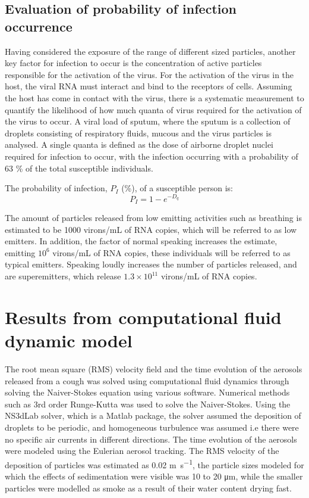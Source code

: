 \documentclass[11pt]{report}
\begin{document}
 
\subsection{Evaluation of probability of infection occurrence}

 
Having considered the exposure of the range of different sized particles, another key factor for infection to occur is the concentration of active particles responsible for the activation of the virus. For the activation of the virus in the host, the viral RNA must interact and bind to the receptors of cells. Assuming the host has come in contact with the virus, there is a systematic measurement to quantify the likelihood of how much quanta of virus required for the activation of the virus to occur. A viral load of sputum, where the sputum is a collection of droplets consisting of respiratory fluids, mucous and the virus particles is analysed. A single quanta is defined as the dose of airborne droplet nuclei required for infection to occur, with the infection occurring with a probability of 63 \% of the total susceptible individuals.
 
The probability of infection, $P_I$ (\%), of a susceptible person is:
\begin{equation}\label{dose_response}
P_I = 1-e^{-D_q}
\end{equation}


The amount of particles released from low emitting activities such as breathing is estimated to be 1000 virons/mL of RNA copies, which will be referred to as low emitters. In addition, the factor of normal speaking increases the estimate, emitting $10^{6}$ virons/mL of RNA copies, these individuals will be referred to as typical emitters. Speaking loudly increases the number of particles released, and are superemitters, which release  $1.3 × 10^{11}$ virons/mL of RNA copies.


\section{Results from computational fluid dynamic model}

The root mean square (RMS) velocity field and the time evolution of the aerosols released from a cough was solved using computational fluid dynamics through solving the Naiver-Stokes equation using various software.  Numerical methods such as 3rd order Runge-Kutta was used to solve the Naiver-Stokes. Using the NS3dLab solver, which is a Matlab package, the solver assumed the deposition of droplets to be periodic, and homogeneous turbulence was assumed i.e there were no specific air currents in different directions. The time evolution of the aerosols were modeled using the Eulerian aerosol tracking. The RMS velocity of the deposition of particles was estimated as 0.02 \si{\meter\second^{-1}}, the particle sizes modeled for which the effects of sedimentation were visible was 10 to 20 \si{\micro\meter}, while the smaller particles were modelled as smoke as a result of their water content drying fast. 
\end{document}

